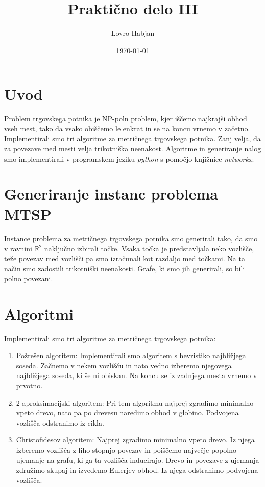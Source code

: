 \documentclass{article}
\title{Praktično delo III}
\author{Lovro Habjan}
\date{\today}
\begin{document}
\maketitle

\section{Uvod}

Problem trgovskega potnika je NP-poln problem, kjer iščemo najkrajši obhod vseh
mest, tako da vsako obiščemo le enkrat in se na koncu vrnemo v
začetno. Implementirali smo tri algoritme za metričnega trgovskega potnika. Zanj
velja, da za povezave med mesti velja trikotniška neenakost. Algoritme in
generiranje nalog smo implementirali v programskem jeziku \textit{python} s
pomočjo knjižnice \textit{networkx}.


\section{Generiranje instanc problema MTSP}

Instance problema za metričnega trgovskega potnika smo generirali tako, da smo v
ravnini $\mathbb{R}^2$ naključno izbirali točke. Vsaka točka je predstavljala
neko vozlišče, teže povezav med vozlišči pa smo izračunali kot razdaljo med
točkami. Na ta način smo zadostili trikotniški neenakosti. Grafe, ki smo jih
generirali, so bili polno povezani.


\section{Algoritmi}

Implementirali smo tri algoritme za metričnega trgovskega potnika:
\begin{enumerate}
\item Požrešen algoritem: Implementirali smo algoritem s hevristiko najbližjega
  soseda. Začnemo v nekem vozlišču in nato vedno izberemo njegovega najbližjega
  soseda, ki še ni obiskan. Na koncu se iz zadnjega mesta vrnemo v prvotno.
\item 2-aproksimacijski algoritem: Pri tem algoritmu najprej zgradimo minimalno
  vpeto drevo, nato pa po drevesu naredimo obhod v globino. Podvojena vozlišča
  odstranimo iz cikla.
\item Christofidesov algoritem: Najprej zgradimo minimalno vpeto drevo. Iz njega
  izberemo vozlišča z liho stopnjo povezav in poiščemo največje popolno ujemanje
  na grafu, ki ga ta vozlišča inducirajo. Drevo in povezave z ujemanja združimo
  skupaj in izvedemo Eulerjev obhod. Iz njega odstranimo podvojena vozlišča.
\end{enumerate}
\end{document}
